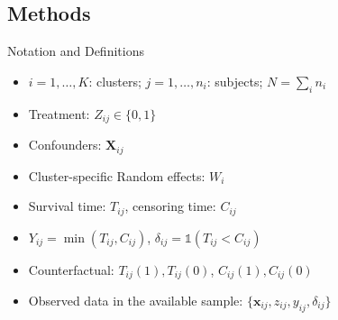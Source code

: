 \documentclass{beamer}
\begin{document}




\subsection{Methods}
\begin{frame}{Notation and Definitions}
  \begin{itemize}
    \vfill \item \(i = 1,\dots,K\): clusters; \(j = 1,\dots,n_i\): subjects; \(N = \sum_i n_i\)
    \vfill \item Treatment: \(Z_{ij} \in \{0,1\}\)
    \vfill \item Confounders: \(\mathbf{X}_{ij}\) 
    \vfill \item Cluster-specific Random effects: $W_i$ 
    \vfill \item Survival time: \(T_{ij}\), censoring time: \(C_{ij}\)
    \vfill \item \(Y_{ij} = \min(T_{ij}, C_{ij})\), \(\delta_{ij} = \mathds{1}(T_{ij} < C_{ij})\)
    \pause
    \vfill \item Counterfactual: \(T_{ij}(1), T_{ij}(0)\), \(C_{ij}(1), C_{ij}(0)\)
    \vfill \item Observed data in the available sample: $\{\mathbf{x}_{ij}, z_{ij}, y_{ij},\delta_{ij} \}$
  \end{itemize}
\end{frame}

\end{document}
